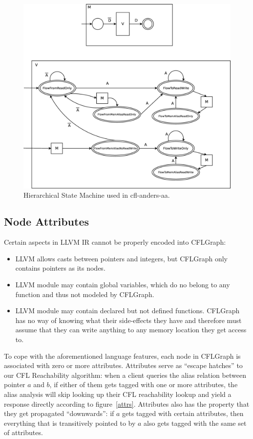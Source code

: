 \documentclass[10pt]{article}
\begin{document}
\begin{figure}
  \centering
  \includegraphics[width=350pt]{FSM2.eps}
  \caption{Hierarchical State Machine used in cfl-anders-aa.\label{fsm2} }
\end{figure}

\subsection{Node Attributes}\label{attribute}

Certain aspects in LLVM IR cannot be properly encoded into CFLGraph:
\begin{itemize}
  \item LLVM allows casts between pointers and integers, but CFLGraph only
    contains pointers as its nodes.
  \item LLVM module may contain global variables, which do no belong to any
    function and thus not modeled by CFLGraph.
  \item LLVM module may contain declared but not defined functions. CFLGraph has
    no way of knowing what their side-effects they have and therefore must
    assume that they can write anything to any memory location they get access
    to. 
\end{itemize}

To cope with the aforementioned language features, each node in CFLGraph is
associated with zero or more attributes. Attributes serve as ``escape hatches''
to our CFL Reachability algorithm: when a client queries the alias relation
between pointer $a$ and $b$, if either of them gets tagged with one or more 
attributes, the alias analysis will skip looking up their CFL reachability
lookup and
yield a response directly according to figure~\ref{attrs}. Attributes also
has the property that they get propagated ``downwards'': if $a$ gets tagged with
certain attributes, then everything that is transitively pointed to by $a$ also
gets tagged with the same set of attributes.
\end{document}
